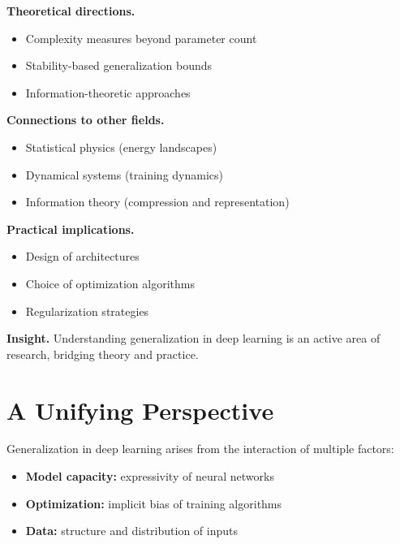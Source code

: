 \medskip

\noindent
\textbf{Theoretical directions.}
\begin{itemize}
    \item Complexity measures beyond parameter count
    \item Stability-based generalization bounds
    \item Information-theoretic approaches
\end{itemize}

\medskip

\noindent
\textbf{Connections to other fields.}
\begin{itemize}
    \item Statistical physics (energy landscapes)
    \item Dynamical systems (training dynamics)
    \item Information theory (compression and representation)
\end{itemize}

\medskip

\noindent
\textbf{Practical implications.}
\begin{itemize}
    \item Design of architectures
    \item Choice of optimization algorithms
    \item Regularization strategies
\end{itemize}

\medskip

\noindent
\textbf{Insight.}  
Understanding generalization in deep learning is an active area of research, bridging theory and practice.

\section{A Unifying Perspective}

Generalization in deep learning arises from the interaction of multiple factors:

\begin{itemize}
    \item \textbf{Model capacity:} expressivity of neural networks
    \item \textbf{Optimization:} implicit bias of training algorithms
    \item \textbf{Data:} structure and distribution of inputs
\end{itemize}

\medskip


